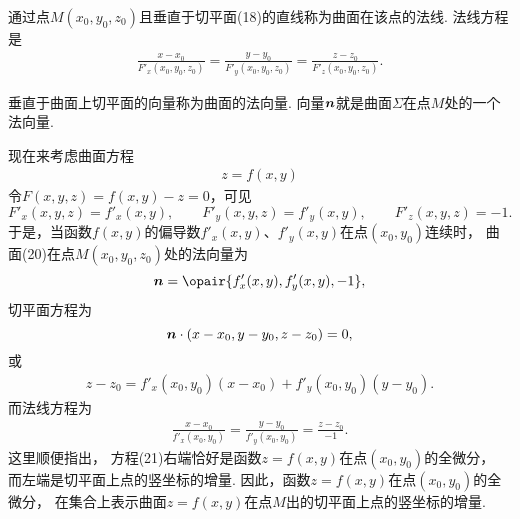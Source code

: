 通过点\(M(x_0,y_0,z_0)\)且垂直于切平面(18)的直线称为曲面在该点的法线.
法线方程是\begin{gather}
	\frac{x-x_0}{F'_x(x_0,y_0,z_0)}
	=\frac{y-y_0}{F'_y(x_0,y_0,z_0)}
	=\frac{z-z_0}{F'_z(x_0,y_0,z_0)}.
	\tag{19}
\end{gather}

垂直于曲面上切平面的向量称为曲面的法向量.
向量\(\boldsymbol{n}\)就是曲面\(\Sigma\)在点\(M\)处的一个法向量.


现在来考虑曲面方程\begin{gather}
	z = f(x,y)
	\tag{20}
\end{gather}
令\(F(x,y,z)=f(x,y)-z=0\)，可见\[
	F'_x(x,y,z) = f'_x(x,y),
	\qquad
	F'_y(x,y,z) = f'_y(x,y),
	\qquad
	F'_z(x,y,z) = -1.
\]
于是，当函数\(f(x,y)\)的偏导数\(f'_x(x,y)\)、\(f'_y(x,y)\)在点\((x_0,y_0)\)连续时，
曲面(20)在点\(M(x_0,y_0,z_0)\)处的法向量为\[
	\vb{n}=\opair{f'_x(x,y),f'_y(x,y),-1},
\]
切平面方程为\[
	\boldsymbol{n}\cdot(x-x_0,y-y_0,z-z_0)=0,
\]或\begin{gather}
	z-z_0 = f'_x(x_0,y_0) (x-x_0) + f'_y(x_0,y_0) (y-y_0).
	\tag{21}
\end{gather}
而法线方程为\begin{gather}
	\frac{x-x_0}{f'_x(x_0,y_0)}
	=\frac{y-y_0}{f'_y(x_0,y_0)}
	=\frac{z-z_0}{-1}.
	\tag{22}
\end{gather}
这里顺便指出，
方程(21)右端恰好是函数\(z = f(x,y)\)在点\((x_0,y_0)\)的全微分，
而左端是切平面上点的竖坐标的增量.
因此，函数\(z = f(x,y)\)在点\((x_0,y_0)\)的全微分，
在集合上表示曲面\(z = f(x,y)\)在点\(M\)出的切平面上点的竖坐标的增量.

